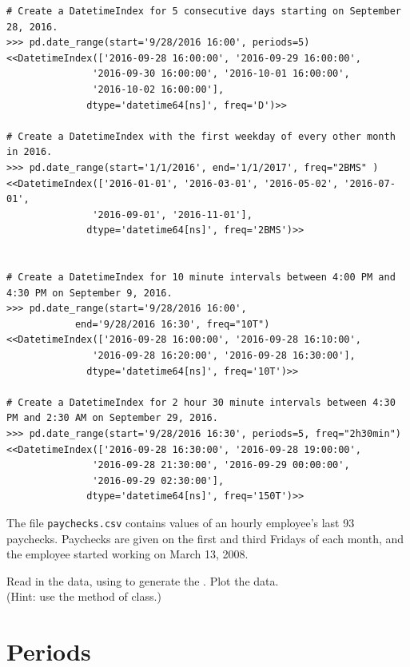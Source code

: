 \begin{lstlisting}
# Create a DatetimeIndex for 5 consecutive days starting on September 28, 2016.
>>> pd.date_range(start='9/28/2016 16:00', periods=5)
<<DatetimeIndex(['2016-09-28 16:00:00', '2016-09-29 16:00:00',
               '2016-09-30 16:00:00', '2016-10-01 16:00:00',
               '2016-10-02 16:00:00'],
              dtype='datetime64[ns]', freq='D')>>

# Create a DatetimeIndex with the first weekday of every other month in 2016.
>>> pd.date_range(start='1/1/2016', end='1/1/2017', freq="2BMS" )
<<DatetimeIndex(['2016-01-01', '2016-03-01', '2016-05-02', '2016-07-01',
               '2016-09-01', '2016-11-01'],
              dtype='datetime64[ns]', freq='2BMS')>>


# Create a DatetimeIndex for 10 minute intervals between 4:00 PM and 4:30 PM on September 9, 2016.
>>> pd.date_range(start='9/28/2016 16:00',
            end='9/28/2016 16:30', freq="10T")
<<DatetimeIndex(['2016-09-28 16:00:00', '2016-09-28 16:10:00',
               '2016-09-28 16:20:00', '2016-09-28 16:30:00'],
              dtype='datetime64[ns]', freq='10T')>>

# Create a DatetimeIndex for 2 hour 30 minute intervals between 4:30 PM and 2:30 AM on September 29, 2016.
>>> pd.date_range(start='9/28/2016 16:30', periods=5, freq="2h30min")
<<DatetimeIndex(['2016-09-28 16:30:00', '2016-09-28 19:00:00',
               '2016-09-28 21:30:00', '2016-09-29 00:00:00',
               '2016-09-29 02:30:00'],
              dtype='datetime64[ns]', freq='150T')>>
\end{lstlisting}

\begin{problem} %
The file \texttt{paychecks.csv} contains values of an hourly employee's last 93 paychecks.
Paychecks are given on the first and third Fridays of each month, and the employee started working on March 13, 2008.

Read in the data, using  to generate the .
Plot the data.
\\(Hint: use the  method of  class.)
\end{problem}

\section*{Periods} %

